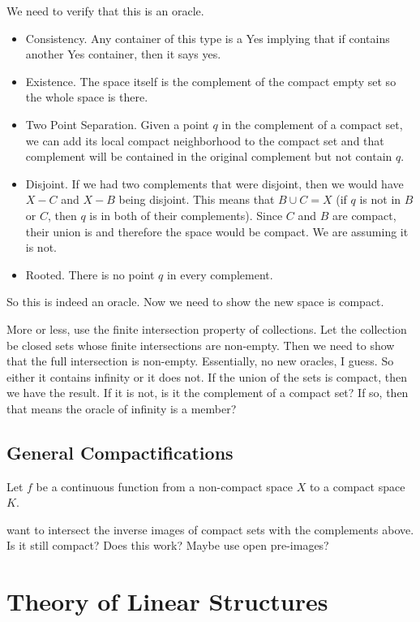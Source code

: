 We need to verify that this is an oracle.  
\begin{itemize}
    \item Consistency. Any container of this type is a Yes implying that if contains another Yes container, then it says yes. 
    \item Existence. The space itself is the complement of the compact empty set so the whole space is there. 
    \item Two Point Separation. Given a point $q$ in the complement of a compact set, we can add its local compact neighborhood to the compact set and that complement will be contained in the original complement but not contain $q$. 
    \item Disjoint. If we had two complements that were disjoint, then we would have $X-C$ and $X-B$ being disjoint. This means that $B \cup C = X$ (if $q$ is not in $B$ or $C$, then $q$ is in both of their complements). Since $C$ and $B$ are compact, their union is and therefore the space would be compact. We are assuming it is not.
    \item Rooted. There is no point $q$ in every complement. 
\end{itemize}

So this is indeed an oracle. Now we need to show the new space is compact. 

More or less, use the finite intersection property of collections. Let the collection be closed sets whose finite intersections are non-empty. Then we need to show that the full intersection is non-empty. Essentially, no new oracles, I guess. So either it contains infinity or it does not. If the union of the sets is compact, then we have the result. If it is not, is it the complement of a compact set? If so, then that means the oracle of infinity is a member? 

\subsection{General Compactifications}

Let $f$ be a continuous function from a non-compact space $X$ to a compact space $K$. 

want to intersect the inverse images of compact sets with the complements above. Is it still compact? Does this work? Maybe use open pre-images? 

\section{Theory of Linear Structures}

